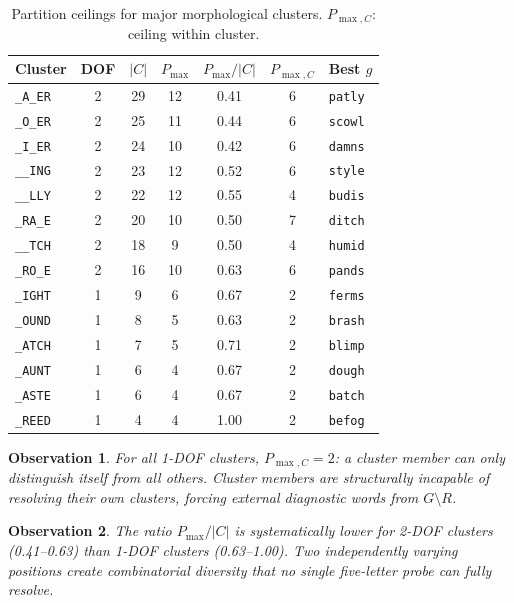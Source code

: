 \documentclass[11pt]{article}
\newtheorem{observation}{Observation}
\begin{document}
	\begin{table}[h]
		\centering
		\caption{Partition ceilings for major morphological clusters.  $P_{\max,C}$: ceiling within cluster.}
		\label{tab:ceilings}
		\begin{tabular}{@{}lcccccl@{}}
			\toprule
			Cluster & DOF & $|C|$ & $P_{\max}$ & $P_{\max}/|C|$ & $P_{\max,C}$ & Best $g$ \\
			\midrule
			\texttt{\_A\_ER} & 2 & 29 & 12 & 0.41 & 6 & \texttt{patly} \\
			\texttt{\_O\_ER} & 2 & 25 & 11 & 0.44 & 6 & \texttt{scowl} \\
			\texttt{\_I\_ER} & 2 & 24 & 10 & 0.42 & 6 & \texttt{damns} \\
			\texttt{\_\_ING} & 2 & 23 & 12 & 0.52 & 6 & \texttt{style} \\
			\texttt{\_\_LLY} & 2 & 22 & 12 & 0.55 & 4 & \texttt{budis} \\
			\texttt{\_RA\_E} & 2 & 20 & 10 & 0.50 & 7 & \texttt{ditch} \\
			\texttt{\_\_TCH} & 2 & 18 & 9 & 0.50 & 4 & \texttt{humid} \\
			\texttt{\_RO\_E} & 2 & 16 & 10 & 0.63 & 6 & \texttt{pands} \\
			\texttt{\_IGHT} & 1 & 9 & 6 & 0.67 & 2 & \texttt{ferms} \\
			\texttt{\_OUND} & 1 & 8 & 5 & 0.63 & 2 & \texttt{brash} \\
			\texttt{\_ATCH} & 1 & 7 & 5 & 0.71 & 2 & \texttt{blimp} \\
			\texttt{\_AUNT} & 1 & 6 & 4 & 0.67 & 2 & \texttt{dough} \\
			\texttt{\_ASTE} & 1 & 6 & 4 & 0.67 & 2 & \texttt{batch} \\
			\texttt{\_REED} & 1 & 4 & 4 & 1.00 & 2 & \texttt{befog} \\
			\bottomrule
		\end{tabular}
	\end{table}
	
	\begin{observation}
		For all 1-DOF clusters, $P_{\max,C} = 2$: a cluster member can only distinguish itself from all others.  Cluster members are structurally incapable of resolving their own clusters, forcing external diagnostic words from $G \setminus R$.
	\end{observation}
	
	\begin{observation}
		The ratio $P_{\max}/|C|$ is systematically lower for 2-DOF clusters (0.41--0.63) than 1-DOF clusters (0.63--1.00).  Two independently varying positions create combinatorial diversity that no single five-letter probe can fully resolve.
	\end{observation}
	
\end{document}
